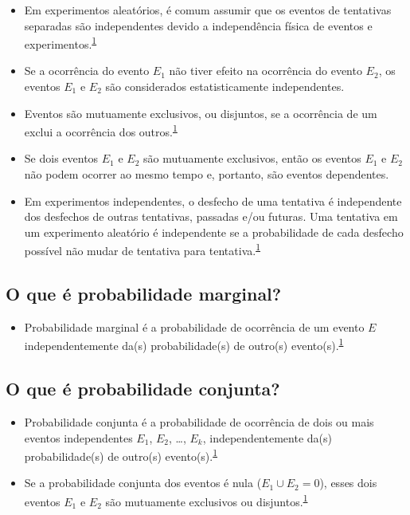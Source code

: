 \documentclass[
  a4paper,
]{book}
\providecommand{\tightlist}{%
  \setlength{\itemsep}{0pt}\setlength{\parskip}{0pt}}
\begin{document}
\begin{itemize}
\item
  Em experimentos aleatórios, é comum assumir que os eventos de tentativas separadas são independentes devido a independência física de eventos e experimentos.\textsuperscript{\protect\hyperlink{ref-grami2023}{1}}
\item
  Se a ocorrência do evento \(E_{1}\) não tiver efeito na ocorrência do evento \(E_{2}\), os eventos \(E_{1}\) e \(E_{2}\) são considerados estatisticamente independentes.
\item
  Eventos são mutuamente exclusivos, ou disjuntos, se a ocorrência de um exclui a ocorrência dos outros.\textsuperscript{\protect\hyperlink{ref-grami2023}{1}}
\item
  Se dois eventos \(E_{1}\) e \(E_{2}\) são mutuamente exclusivos, então os eventos \(E_{1}\) e \(E_{2}\) não podem ocorrer ao mesmo tempo e, portanto, são eventos dependentes.
\item
  Em experimentos independentes, o desfecho de uma tentativa é independente dos desfechos de outras tentativas, passadas e/ou futuras. Uma tentativa em um experimento aleatório é independente se a probabilidade de cada desfecho possível não mudar de tentativa para tentativa.\textsuperscript{\protect\hyperlink{ref-grami2023}{1}}
\end{itemize}

\hypertarget{o-que-uxe9-probabilidade-marginal}{%
\subsection{O que é probabilidade marginal?}\label{o-que-uxe9-probabilidade-marginal}}

\begin{itemize}
\tightlist
\item
  Probabilidade marginal é a probabilidade de ocorrência de um evento \(E\) independentemente da(s) probabilidade(s) de outro(s) evento(s).\textsuperscript{\protect\hyperlink{ref-grami2023}{1}}
\end{itemize}

\hypertarget{o-que-uxe9-probabilidade-conjunta}{%
\subsection{O que é probabilidade conjunta?}\label{o-que-uxe9-probabilidade-conjunta}}

\begin{itemize}
\item
  Probabilidade conjunta é a probabilidade de ocorrência de dois ou mais eventos independentes \(E_{1}\), \(E_{2}\), \ldots, \(E_{k}\), independentemente da(s) probabilidade(s) de outro(s) evento(s).\textsuperscript{\protect\hyperlink{ref-grami2023}{1}}
\item
  Se a probabilidade conjunta dos eventos é nula (\(E_{1} \cup E_{2} = 0\)), esses dois eventos \(E_{1}\) e \(E_{2}\) são mutuamente exclusivos ou disjuntos.\textsuperscript{\protect\hyperlink{ref-grami2023}{1}}
\end{itemize}
\end{document}
